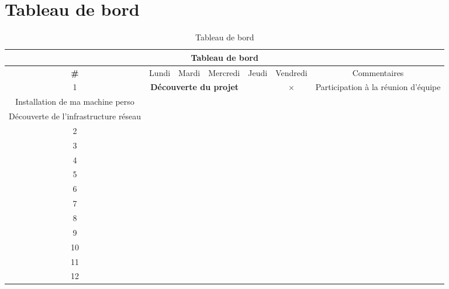 \section{Tableau de bord}

\begin{table}[h]
\begin{tabular}{|*{7}{c|}}
\hline
\multicolumn{7}{|c|}{Tableau de bord}                                  \\\hline
\textbf{\#} & Lundi & Mardi & Mercredi & Jeudi & Vendredi & Commentaires \\\hline
1 & \multicolumn{3}{c}{\textbf{Découverte du projet}}& & $\times$ &
Participation à la réunion d'équipe\\ Installation de ma machine perso \\ Découverte de l'infrastructure réseau \\\hline
2       &       &       &          &       &          &              \\\hline
3       &       &       &          &       &          &              \\\hline
4       &       &       &          &       &          &              \\\hline
5       &       &       &          &       &          &              \\\hline
6       &       &       &          &       &          &              \\\hline
7       &       &       &          &       &          &              \\\hline
8       &       &       &          &       &          &              \\\hline
9       &       &       &          &       &          &              \\\hline
10      &       &       &          &       &          &              \\\hline
11      &       &       &          &       &          &              \\\hline
12      &       &       &          &       &          &            \\\hline 
\end{tabular}
\caption{Tableau de bord}
\centering
\end{table}
